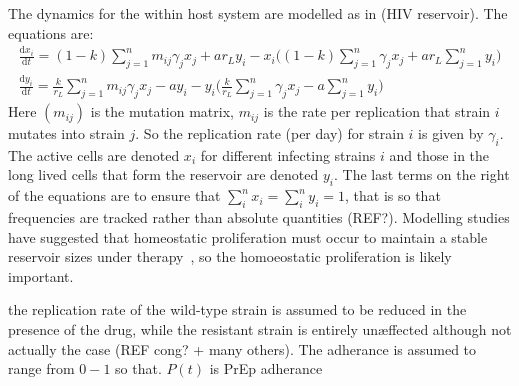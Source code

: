 \documentclass[DIV=15]{scrartcl}
\begin{document}
  The dynamics for the within host system  are modelled as in (HIV reservoir). The equations are:
 \begin{gather*}
\frac{\text{d} x_i}{\text{d} t} = (1-k) \sum_{j=1}^n m_{ij} \gamma_j x_j + a r_L y_i - x_i\bigg((1-k) \sum_{j=1}^n  \gamma_j x_j + ar_L \sum_{j=1}^n y_i \bigg)  \\
\frac{\text{d} y_i}{\text{d} t} = \frac{k}{r_L} \sum_{j=1}^n m_{ij} \gamma_j x_j - a y_i - y_i\bigg(\frac{k}{r_L} \sum_{j=1}^n  \gamma_j x_j - a \sum_{j=1}^n y_i \bigg) 
\end{gather*} 
Here $(m_{ij})$ is the mutation matrix, $m_{ij}$ is the rate per replication  that strain $i$ mutates into strain $j$. So the replication rate (per day)  for strain $i$ is given by $ \gamma_i$. The  active cells are denoted $ x_i$ for different infecting strains $i$  and those in the  long lived cells that form the reservoir are denoted $y_i$.  The last  terms on the right of the equations are to ensure that  $ \sum_i^n x_i = \sum_i^n y_i = 1$, that is so that frequencies are tracked rather than absolute quantities (REF?). Modelling studies have suggested that homeostatic proliferation must occur to maintain a stable reservoir sizes under therapy~\cite{kim2006,rong2009}, so the homoeostatic proliferation is likely important.

\iffalse
worst case for development of resistance is when virus is already present and people go onto PrPE (REF iprex etc) also  can model non-adherance by reducing average doing of the drug
\fi




\iffalse

 the replication rate of the wild-type strain is assumed to be reduced in the presence of the drug, while the resistant strain is entirely un{\ae}ffected although not actually the case (REF  cong? + many others). The adherance is assumed to range from $0-1$ so that. $P(t)$ is PrEp adherance 
\end{document}
